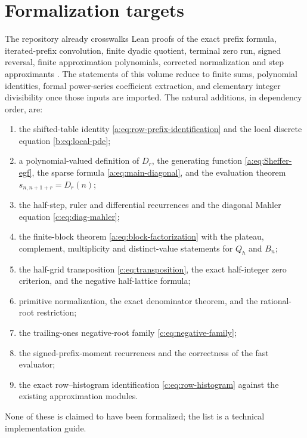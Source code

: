 \documentclass[11pt,a4paper,oneside,openany]{book}
\numberwithin{equation}{chapter}
\theoremstyle{definition}
\theoremstyle{remark}
\newcommand{\Diag}{D}
\begin{document}
\section{Formalization targets}
The repository already crosswalks Lean proofs of the exact prefix formula,
iterated-prefix convolution, finite dyadic quotient, terminal zero run,
signed reversal, finite approximation polynomials, corrected normalization
and step approximants \cite{atlas,proveit-prefix,proveit-approx}. The
statements of this volume reduce to finite sums, polynomial identities,
formal power-series coefficient extraction, and elementary integer
divisibility once those inputs are imported. The natural additions, in
dependency order, are:
\begin{enumerate}
\item the shifted-table identity \eqref{a:eq:row-prefix-identification} and
the local discrete equation \eqref{b:eq:local-pde};
\item a polynomial-valued definition of $\Diag_r$, the generating function
\eqref{a:eq:Sheffer-egf}, the sparse formula \eqref{a:eq:main-diagonal}, and
the evaluation theorem $s_{n,n+1+r}=\Diag_r(n)$;
\item the half-step, ruler and differential recurrences and the diagonal
Mahler equation \eqref{c:eq:diag-mahler};
\item the finite-block theorem \eqref{a:eq:block-factorization} with the
plateau, complement, multiplicity and distinct-value statements for $Q_h$
and $B_n$;
\item the half-grid transposition \eqref{c:eq:transposition}, the exact
half-integer zero criterion, and the negative half-lattice formula;
\item primitive normalization, the exact denominator theorem, and the
rational-root restriction;
\item the trailing-ones negative-root family \eqref{c:eq:negative-family};
\item the signed-prefix-moment recurrences and the correctness of the fast
evaluator;
\item the exact row--histogram identification \eqref{c:eq:row-histogram}
against the existing approximation modules.
\end{enumerate}
None of these is claimed to have been formalized; the list is a technical
implementation guide.


\appendix

\end{document}
